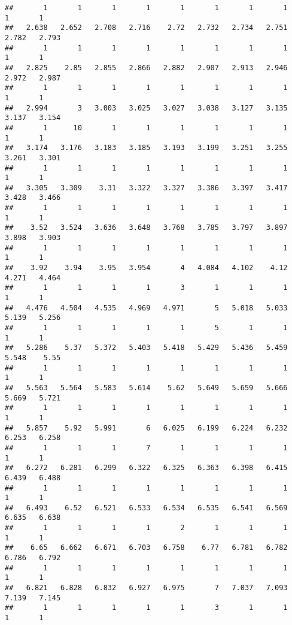 \documentclass[]{article}
\begin{document}
\begin{verbatim}
##       1       1       1       1       1       1       1       1       1       1 
##   2.638   2.652   2.708   2.716    2.72   2.732   2.734   2.751   2.782   2.793 
##       1       1       1       1       1       1       1       1       1       1 
##   2.825    2.85   2.855   2.866   2.882   2.907   2.913   2.946   2.972   2.987 
##       1       1       1       1       1       1       1       1       1       1 
##   2.994       3   3.003   3.025   3.027   3.038   3.127   3.135   3.137   3.154 
##       1      10       1       1       1       1       1       1       1       1 
##   3.174   3.176   3.183   3.185   3.193   3.199   3.251   3.255   3.261   3.301 
##       1       1       1       1       1       1       1       1       1       1 
##   3.305   3.309    3.31   3.322   3.327   3.386   3.397   3.417   3.428   3.466 
##       1       1       1       1       1       1       1       1       1       1 
##    3.52   3.524   3.636   3.648   3.768   3.785   3.797   3.897   3.898   3.903 
##       1       1       1       1       1       1       1       1       1       1 
##    3.92    3.94    3.95   3.954       4   4.084   4.102    4.12   4.271   4.464 
##       1       1       1       1       3       1       1       1       1       1 
##   4.476   4.504   4.535   4.969   4.971       5   5.018   5.033   5.139   5.256 
##       1       1       1       1       1       5       1       1       1       1 
##   5.286    5.37   5.372   5.403   5.418   5.429   5.436   5.459   5.548    5.55 
##       1       1       1       1       1       1       1       1       1       1 
##   5.563   5.564   5.583   5.614    5.62   5.649   5.659   5.666   5.669   5.721 
##       1       1       1       1       1       1       1       1       1       1 
##   5.857    5.92   5.991       6   6.025   6.199   6.224   6.232   6.253   6.258 
##       1       1       1       7       1       1       1       1       1       1 
##   6.272   6.281   6.299   6.322   6.325   6.363   6.398   6.415   6.439   6.488 
##       1       1       1       1       1       1       1       1       1       1 
##   6.493    6.52   6.521   6.533   6.534   6.535   6.541   6.569   6.635   6.638 
##       1       1       1       1       2       1       1       1       1       1 
##    6.65   6.662   6.671   6.703   6.758    6.77   6.781   6.782   6.786   6.792 
##       1       1       1       1       1       1       1       1       1       1 
##   6.821   6.828   6.832   6.927   6.975       7   7.037   7.093   7.139   7.145 
##       1       1       1       1       1       3       1       1       1       1 

\end{verbatim}
\end{document}
